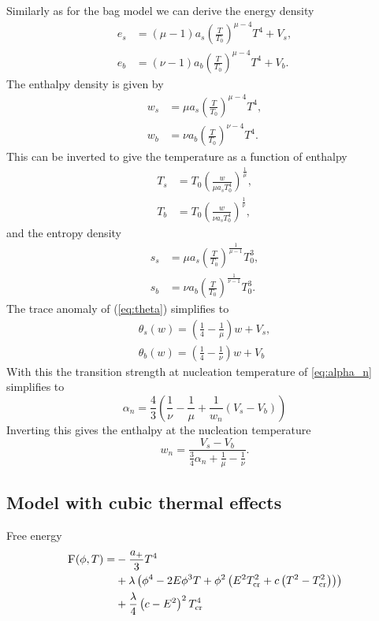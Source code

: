 Similarly as for the bag model we can derive the energy density
\begin{align}
e_s &= (\mu - 1) a_s \left( \frac{T}{T_0} \right)^{\mu-4} T^4 + V_s, \\
e_b &= (\nu - 1) a_b \left( \frac{T}{T_0} \right)^{\mu-4} T^4 + V_b.
\end{align}
The enthalpy density is given by
\begin{align}
w_s &= \mu a_s \left( \frac{T}{T_0} \right)^{\mu-4} T^4, \\
w_b &= \nu a_b \left( \frac{T}{T_0} \right)^{\nu-4} T^4.
\end{align}
This can be inverted to give the temperature as a function of enthalpy
\begin{align}
T_s &= T_0 \left( \frac{w}{\mu a_s T_0^4} \right)^\frac{1}{\mu}, \\
T_b &= T_0 \left( \frac{w}{\nu a_s T_0^4} \right)^\frac{1}{\nu},
\end{align}
and the entropy density
\begin{align}
s_s &= \mu a_s \left( \frac{T}{T_0} \right)^\frac{1}{\mu-1} T_0^3, \\
s_b &= \nu a_b \left( \frac{T}{T_0} \right)^\frac{1}{\nu-1} T_0^3.
\end{align}
The trace anomaly of (\ref{eq:theta}) simplifies to
\begin{align}
\theta_s(w) = \left( \frac{1}{4} - \frac{1}{\mu} \right) w + V_s, \\
\theta_b(w) = \left( \frac{1}{4} - \frac{1}{\nu} \right) w + V_b
\end{align}
With this the transition strength at nucleation temperature of \ref{eq:alpha_n} simplifies to
\begin{equation}
\alpha_n = \frac{4}{3} \left( \frac{1}{\nu} - \frac{1}{\mu} + \frac{1}{w_n} (V_s - V_b) \right)
\end{equation}
Inverting this gives the enthalpy at the nucleation temperature
\begin{equation}
w_n = \frac{V_s - V_b}{ \frac{3}{4} \alpha_n + \frac{1}{\mu} - \frac{1}{\nu} }.
\end{equation}


\subsection{Model with cubic thermal effects}
Free energy
\cite[eq. 45]{giese_2020}
\begin{align}
\begin{split}
\textsc{F}(\phi, T) =
&- \frac{a_+}{3} T^4 \\
&+ \lambda \left( \phi^4 - 2E\phi^3 T + \phi^2 \left( E^2 T_\text{cr}^2 + c \left( T^2 - T_\text{cr}^2 \right) \right) \right) \\
&+ \frac{\lambda}{4} \left( c - E^2 \right)^2 T_\text{cr}^4
\end{split}
\end{align}

